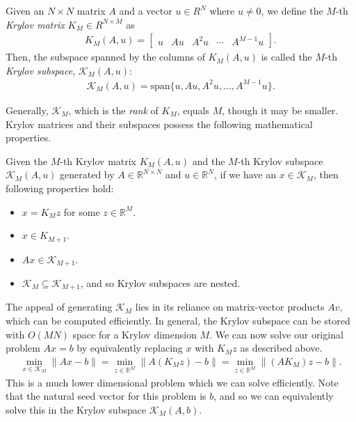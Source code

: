 \begin{definition}
    Given an $N \times N$ matrix $A$ and a vector $u \in R^N$ where $u \neq 0$, we define the $M$-th \textit{Krylov matrix} $K_M \in R^{N \times M}$ as
    \begin{align}
        K_M(A, u) = \begin{bmatrix} u & A u & A^2 u & \cdots & A^{M-1} u \end{bmatrix}.
        \label{eq:krylov_matrix}
    \end{align}
    Then, the subspace spanned by the columns of $K_M(A, u)$ is called the $M$-th \textit{Krylov subspace}, $\mathcal{K}_M(A, u)$:
    \begin{align}
        \mathcal{K}_M(A, u) = \text{span} \{u, A u, A^2 u, \ldots, A^{M-1} u \}.
    \end{align}
\end{definition}

Generally, $\mathcal{K}_M$, which is the \textit{rank} of $K_M$, equals $M$, though it may be smaller. Krylov matrices and their subspaces possess the following mathematical properties.
\begin{definition}
    Given the $M$-th Krylov matrix $K_M(A, u)$ and the $M$-th Krylov subspace $\mathcal{K}_M(A, u)$ generated by $A \in \mathbb{R}^{N \times N}$ and $u \in \mathbb{R}^N$, if we have an $x \in \mathcal{K}_M$, then following properties hold:
    \begin{itemize}
        \item $x = K_M z$ for some $z \in \mathbb{R}^M$.
        \item $x \in K_{M+1}$.
        \item $A x \in \mathcal{K}_{M+1}$.
        \item $\mathcal{K}_M \subseteq \mathcal{K}_{M+1}$, and so Krylov subspaces are nested.
    \end{itemize}
    \label{definition:krylov_properties}
\end{definition}

The appeal of generating $\mathcal{K}_M$ lies in its reliance on matrix-vector products $A v$, which can be computed efficiently. In general, the Krylov subspace can be stored with $O(M N)$ space for a Krylov dimension $M$. We can now solve our original problem $Ax = b$ by equivalently replacing $x$ with $K_M z$ as described above.
\begin{align}
    \min_{x \in \mathcal{K}_M} \| A x - b \| = \min_{z \in \mathbb{R}^M} \| A (K_M z) - b \| = \min_{z \in \mathbb{R}^M} \| (A K_M) z - b \|.
    \label{equation:krylov_subspace_problem}
\end{align}
This is a much lower dimensional problem which we can solve efficiently.
Note that the natural seed vector for this problem is $b$, and so we can equivalently solve this in the Krylov subspace $\mathcal{K}_M(A, b)$.

